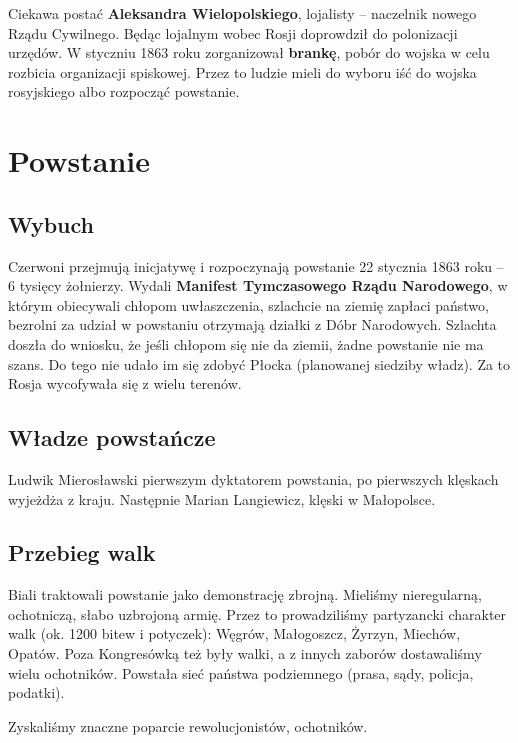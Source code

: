 \documentclass [a4paper, 11pt, oneside]{book}
\begin{document}
            Ciekawa postać \textbf{Aleksandra Wielopolskiego}, lojalisty -- naczelnik nowego Rządu Cywilnego. Będąc lojalnym wobec Rosji doprowdził do polonizacji urzędów. W styczniu 1863 roku zorganizował \textbf{brankę}, pobór do wojska w celu rozbicia organizacji spiskowej. Przez to ludzie mieli do wyboru iść do wojska rosyjskiego albo rozpocząć powstanie.
    \section{Powstanie} %
    \label{sec:powstanie}
        \subsection{Wybuch} %
        \label{sub:wybuch}
            Czerwoni przejmują inicjatywę i rozpoczynają powstanie 22 stycznia 1863 roku -- 6 tysięcy żołnierzy. Wydali \textbf{Manifest Tymczasowego Rządu Narodowego}, w którym obiecywali chłopom uwłaszczenia, szlachcie na ziemię zapłaci państwo, bezrolni za udział w powstaniu otrzymają działki z Dóbr Narodowych. Szlachta doszła do wniosku, że jeśli chłopom się nie da ziemii, żadne powstanie nie ma szans. Do tego nie udało im się zdobyć Płocka (planowanej siedziby władz). Za to Rosja wycofywała się z wielu terenów.
        \subsection{Władze powstańcze} %
        \label{sub:w_adze_powsta_zce}
            Ludwik Mierosławski pierwszym dyktatorem powstania, po pierwszych klęskach wyjeżdża z kraju. Następnie Marian Langiewicz, klęski w Małopolsce.
        \subsection{Przebieg walk} %
        \label{sub:przebieg_walk}
            Biali traktowali powstanie jako demonstrację zbrojną. Mieliśmy nieregularną, ochotniczą, słabo uzbrojoną armię. Przez to prowadziliśmy partyzancki charakter walk (ok. 1200 bitew i potyczek): Węgrów, Małogoszcz, Żyrzyn, Miechów, Opatów. Poza Kongresówką też były walki, a z innych zaborów dostawaliśmy wielu ochotników. Powstała sieć państwa podziemnego (prasa, sądy, policja, podatki).

            Zyskaliśmy znaczne poparcie rewolucjonistów, ochotników.
\end{document}
